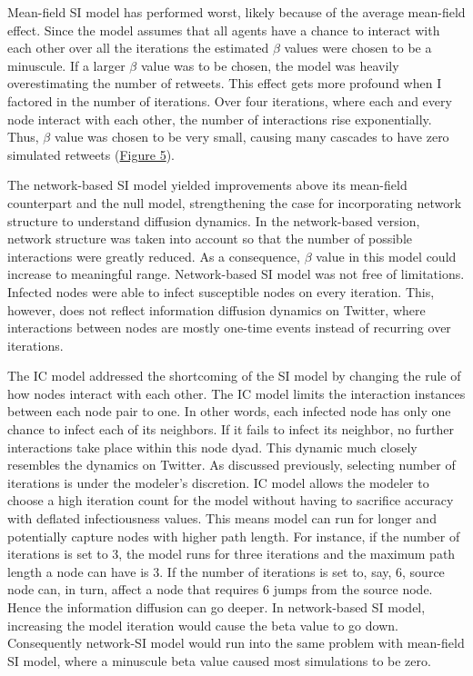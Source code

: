 \documentclass[11pt,a4paper]{article}
\begin{document}
    Mean-field SI model has performed worst, likely because of the average mean-field effect. Since the model assumes that all agents have a chance to interact with each other over all the iterations the estimated $\beta$ values were chosen to be a minuscule. If a larger $\beta$ value was to be chosen, the model was heavily overestimating the number of retweets. This effect gets more profound when I factored in the number of iterations. Over four iterations, where each and every node interact with each other, the number of interactions rise exponentially. Thus, $\beta$ value was chosen to be very small, causing many cascades to have zero simulated retweets (\hyperlink{fig:base-SI}{Figure 5}).
    
    The network-based SI model yielded improvements above its mean-field counterpart and the null model, strengthening the case for incorporating network structure to understand diffusion dynamics. In the network-based version, network structure was taken into account so that the number of possible interactions were greatly reduced. As a consequence, $\beta$ value in this model could increase to meaningful range. Network-based SI model was not free of limitations. Infected nodes were able to infect susceptible nodes on every iteration. This, however, does not reflect information diffusion dynamics on Twitter, where interactions between nodes are mostly one-time events instead of recurring over iterations.
    
    The IC model addressed the shortcoming of the SI model by changing the rule of how nodes interact with each other. The IC model limits the interaction instances between each node pair to one. In other words, each infected node has only one chance to infect each of its neighbors. If it fails to infect its neighbor, no further interactions take place within this node dyad. This dynamic much closely resembles the dynamics on Twitter. As discussed previously, selecting number of iterations is under the modeler's discretion. IC model allows the modeler to choose a high iteration count for the model without having to sacrifice accuracy with deflated infectiousness values. This means model can run for longer and potentially capture nodes with higher path length. For instance, if the number of iterations is set to 3, the model runs for three iterations and the maximum path length a node can have is 3. If the number of iterations is set to, say, 6, source node can, in turn, affect a node that requires 6 jumps from the source node. Hence the information diffusion can go deeper. In network-based SI model, increasing the model iteration would cause the beta value to go down. Consequently network-SI model would run into the same problem with mean-field SI model, where a minuscule beta value caused most simulations to be zero.
    
\end{document}

